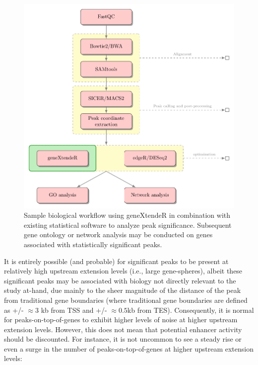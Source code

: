 \documentclass[12pt]{article}
\begin{document}
\begin{figure}[H]
\centering
\includegraphics{figures/workflow.pdf}
\caption{Sample biological workflow using geneXtendeR in combination with existing statistical software to analyze peak significance.  Subsequent gene ontology or network analysis may be conducted on genes associated with statistically significant peaks.}
\end{figure}

It is entirely possible (and probable) for significant peaks to be present at relatively high upstream extension levels (i.e., large gene-spheres), albeit these significant peaks may be associated with biology not directly relevant to the study at-hand, due mainly to the sheer magnitude of the distance of the peak from traditional gene boundaries (where traditional gene boundaries are defined as +/- $\approx 3$ kb from TSS and +/- $\approx 0.5$kb from TES).  Consequently, it is normal for peaks-on-top-of-genes to exhibit higher levels of noise at higher upstream extension levels.  However, this does not mean that potential enhancer activity should be discounted.  For instance, it is not uncommon to see a steady rise or even a surge in the number of peaks-on-top-of-genes at higher upstream extension levels:
\end{document}
